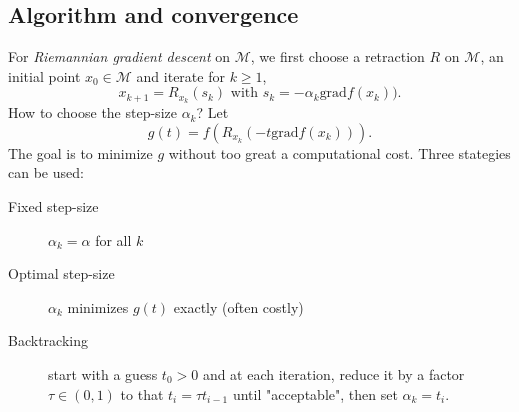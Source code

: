 \documentclass[10pt,a4paper]{book}
\theoremstyle{definition}
\theoremstyle{plain}
\theoremstyle{remark}
\newcommand{\grad}{\textrm{grad}}
\newcommand \M {\mathcal{M}}
\begin{document}
\subsection{Algorithm and convergence}
For \emph{Riemannian gradient descent} on $\M$, we first choose a retraction $R$ on $\M$, an initial point $x_0\in \M$ and iterate for $k\ge 1$, 
$$x_{k+1}=R_{x_k}(s_k)\text{ with }s_k=-\alpha_k \grad f(x_k)).$$
How to choose the step-size $\alpha_k$? Let 
$$g(t)=f\left(R_{x_k}(-t\grad f(x_k))\right).$$
The goal is to minimize $g$ without too great a computational cost. Three stategies can be used:
\begin{description}
\item[Fixed step-size] $\alpha_k=\alpha$ for all $k$
\item[Optimal step-size] $\alpha_k$ minimizes $g(t)$ exactly (often costly)
\item[Backtracking] start with a guess $t_0>0$ and at each iteration, reduce it by a factor $\tau \in (0,1)$ to that $t_i=\tau t_{i-1}$ until "acceptable", then set $\alpha_k=t_i$. 
\end{description}
\end{document}
